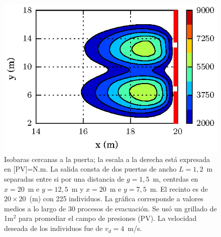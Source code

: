 \begin{figure}[H]
    \centering
    \includegraphics[scale=1]{figuras/isobaras_g5.eps}			\caption[width=5cm]{Isobaras cercanas a la puerta; la escala a la derecha está expresada en [PV]=N.m. La salida consta de dos puertas de ancho $L=1,2$~m separadas entre si por una distancia de $g=1,5$~m, centrdas en $x=20$~m e $y=12,5$~m y $x=20$~m e $y=7,5$~m. El recinto es de $20\times 20$~(m) con 225 individuos. La gráfica corresponde a valores medios a lo largo de 30 procesos de evacuación. Se usó un grillado de 1m$^2$ para promediar el campo de presiones (PV). La velocidad deseada de los individuos fue de $v_d=4$~m/s.}
    \label{presion_225p_g5}
\end{figure}




